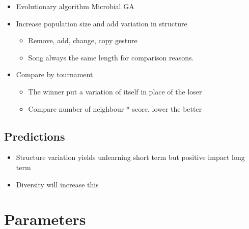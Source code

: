 \begin{itemize}
\tightlist
\item
  Evolutionary algorithm Microbial GA
\item
  Increase population size and add variation in structure

  \begin{itemize}
  \tightlist
  \item
    Remove, add, change, copy gesture
  \item
    Song always the same length for comparison reasons.
  \end{itemize}
\item
  Compare by tournament

  \begin{itemize}
  \tightlist
  \item
    The winner put a variation of itself in place of the loser
  \item
    Compare number of neighbour * score, lower the better
  \end{itemize}
\end{itemize}

\subsection{Predictions}\label{predictions}

\begin{itemize}
\tightlist
\item
  Structure variation yields unlearning short term but positive impact
  long term
\item
  Diversity will increase this
\end{itemize}

\section{Parameters}\label{parameters}


